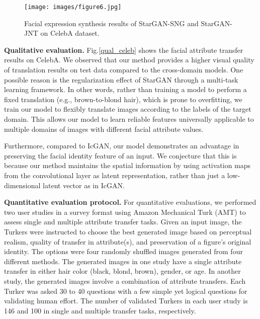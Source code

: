 \documentclass[10pt,twocolumn,letterpaper]{article}
\begin{document}
\begin{figure*}[t]
\centering
\centerline{\texttt{[image: images/figure6.jpg]}}
\caption{Facial expression synthesis results of StarGAN-SNG and StarGAN-JNT on CelebA dataset.}
\label{figure6}
\vspace{-0.1in}
\end{figure*}

\noindent\textbf{Qualitative evaluation.} Fig.\thinspace\ref{qual_celeb} shows the facial attribute transfer results on CelebA. We observed that our method provides a higher visual quality of translation results on test data compared to the cross-domain models. One possible reason is the regularization effect of StarGAN through a multi-task learning framework. In other words, rather than training a model to perform a fixed translation (e.g., brown-to-blond hair), which is prone to overfitting, we train our model to flexibly translate images according to the labels of the target domain. This allows our model to learn reliable features universally applicable to multiple domains of images with different facial attribute values. 

Furthermore, compared to IcGAN, our model demonstrates an advantage in preserving the facial identity feature of an input. We conjecture that this is because our method maintains the spatial information by using activation maps from the convolutional layer as latent representation, rather than just a low-dimensional latent vector as in IcGAN. 

\medskip

\noindent\textbf{Quantitative evaluation protocol.} For quantitative evaluations, we performed two user studies in a survey format using Amazon Mechanical Turk (AMT) to assess single and multiple attribute transfer tasks. Given an input image, the Turkers were instructed to choose the best generated image based on perceptual realism, quality of transfer in attribute(s), and preservation of a figure's original identity. The options were four randomly shuffled images generated from four different methods. The generated images in one study have a single attribute transfer in either hair color (black, blond, brown), gender, or age. In another study, the generated images involve a combination of attribute transfers. Each Turker was asked 30 to 40 questions with a few simple yet logical questions for validating human effort. The number of validated Turkers in each user study is 146 and 100 in single and multiple transfer tasks, respectively.
\medskip
\end{document}
